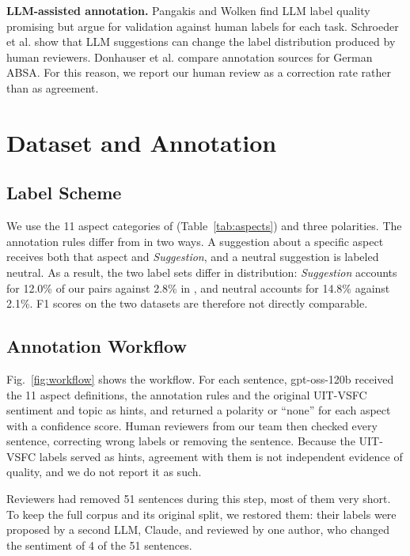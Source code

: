 \documentclass[9pt, conference, a4paper, compsocconf]{IEEEtran}
\begin{document}
\textbf{LLM-assisted annotation.} Pangakis and Wolken \cite{pangakis2024keeping} find LLM label quality promising but argue for validation against human labels for each task. Schroeder et al. \cite{schroeder2025human} show that LLM suggestions can change the label distribution produced by human reviewers. Donhauser et al. \cite{donhauser2026annotation} compare annotation sources for German ABSA. For this reason, we report our human review as a correction rate rather than as agreement.

\section{Dataset and Annotation}
\subsection{Label Scheme}
We use the 11 aspect categories of \cite{sau2021absa} (Table~\ref{tab:aspects}) and three polarities. The annotation rules differ from \cite{sau2021absa} in two ways. A suggestion about a specific aspect receives both that aspect and \textit{Suggestion}, and a neutral suggestion is labeled neutral. As a result, the two label sets differ in distribution: \textit{Suggestion} accounts for 12.0\% of our pairs against 2.8\% in \cite{sau2021absa}, and neutral accounts for 14.8\% against 2.1\%. F1 scores on the two datasets are therefore not directly comparable.

\begin{table}[!t]
\renewcommand{\arraystretch}{1.1}
\caption{\uppercase{Aspect categories and label counts}}
\label{tab:aspects}
\centering

\end{table}

\subsection{Annotation Workflow}
Fig.~\ref{fig:workflow} shows the workflow. For each sentence, gpt-oss-120b received the 11 aspect definitions, the annotation rules and the original UIT-VSFC sentiment and topic as hints, and returned a polarity or ``none'' for each aspect with a confidence score. Human reviewers from our team then checked every sentence, correcting wrong labels or removing the sentence. Because the UIT-VSFC labels served as hints, agreement with them is not independent evidence of quality, and we do not report it as such.

Reviewers had removed 51 sentences during this step, most of them very short. To keep the full corpus and its original split, we restored them: their labels were proposed by a second LLM, Claude, and reviewed by one author, who changed the sentiment of 4 of the 51 sentences.
\end{document}
